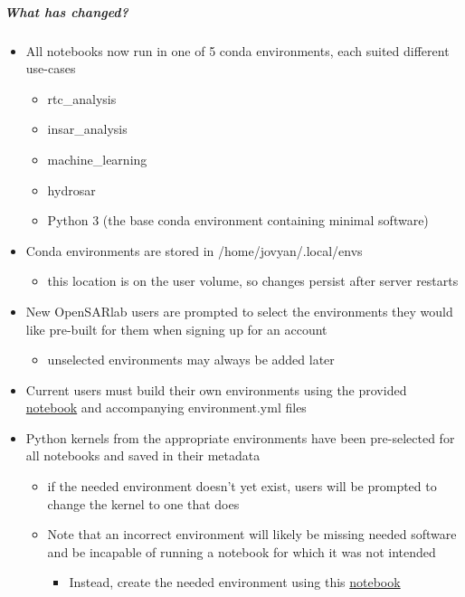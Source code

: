 \subparagraph{What has changed?}

\begin{itemize}
\item All notebooks now run in one of 5 conda environments, each suited different use-cases\begin{itemize}
\item rtc\_analysis
\item insar\_analysis
\item machine\_learning
\item hydrosar
\item Python 3 (the base conda environment containing minimal software)
\end{itemize}


\item Conda environments are stored in /home/jovyan/.local/envs\begin{itemize}
\item this location is on the user volume, so changes persist after server restarts
\end{itemize}


\item New OpenSARlab users are prompted to select the environments they would like pre-built for them when signing up for an account\begin{itemize}
\item unselected environments may always be added later
\end{itemize}


\item Current users must build their own environments using the provided \href{https://github.com/ASFOpenSARlab/opensarlab-envs/blob/main/Create\_OSL\_Conda\_Environments.ipynb}{notebook} and accompanying environment.yml files
\item Python kernels from the appropriate environments have been pre-selected for all notebooks and saved in their metadata\begin{itemize}
\item if the needed environment doesn't yet exist, users will be prompted to change the kernel to one that does
\item Note that an incorrect environment will likely be missing needed software and be incapable of running a notebook for which it was not intended\begin{itemize}
\item Instead, create the needed environment using this \href{https://github.com/ASFOpenSARlab/opensarlab-envs/blob/main/Create\_OSL\_Conda\_Environments.ipynb}{notebook}
\end{itemize}
\end{itemize}



\end{itemize}
